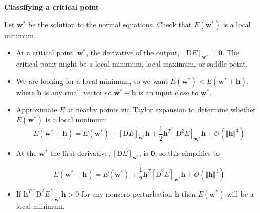 \documentclass[12pt,letterpaper,noanswers]{exam}
\newcommand{\vc}[1]{\boldsymbol{#1}}
\begin{document}
  

    
   
    









\noindent\textbf{Classifying a critical point}

Let $\vc{w}^*$ be the solution to the normal equations.  Check that $E(\vc{w}^*)$ is a local minimum.
  \vspace{0.2cm}

\begin{tcolorbox}
\begin{itemize}
\itemsep0pt
    \item At a critical point, $\vc{w}^*$, the derivative of the output, $\left[\text{D}E\right]_{\vc{w}^*} = \vc{0}$.  The critical point might be a local minimum, local maximum, or saddle point.
    \item We are looking for a local minimum, so we want $E(\vc{w}^*) < E(\vc{w}^*+\vc{h})$, where $\vc{h}$ is any small vector so $\vc{w}^*+\vc{h}$ is an input close to $\vc{w}^*$.
    
    \item Approximate $E$ at nearby points via Taylor expansion to determine whether $E(\vc{w}^*)$ is a local minimum:
    \[E(\vc{w}^*+\vc{h}) = E(\vc{w}^*) + \left[\text{D}E\right]_{\vc{w}^*}\vc{h} + \frac{1}{2} \vc{h}^T\left[\text{D}^2E\right]_{\vc{w}^*}\vc{h} + \mathcal{O}(\Vert\vc{h}\Vert^3)\]
        \end{itemize}
\end{tcolorbox}


    \begin{tcolorbox}
    \begin{itemize}
  \item  
    At the $\vc{w}^*$ the first derivative, $\left[\text{D}E\right]_{\vc{w}^*}$, is $\vc{0}$, so this simplifies to 
    
    \[E(\vc{w}^*+\vc{h}) = E(\vc{w}^*) +  \frac{1}{2} \vc{h}^T\left[\text{D}^2E\right]_{\vc{w}^*}\vc{h} + \mathcal{O}(\Vert\vc{h}\Vert^3)\]
    \item If $ \vc{h}^T\left[\text{D}^2E\right]_{\vc{w}^*}\vc{h}>0$ for any nonzero perturbation $\vc{h}$ then $E(\vc{w}^*)$ will be a local minimum.
    \end{itemize}
\end{tcolorbox}
\end{document}

